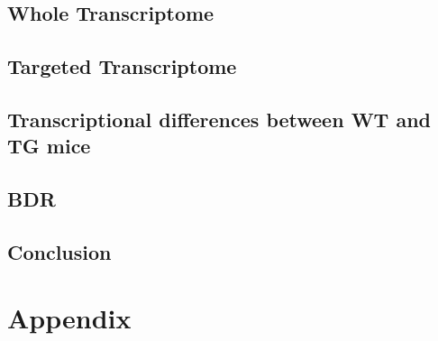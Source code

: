 \documentclass[a4paper,12pt,oneside]{report}
\begin{document}
\chapter{Whole Transcriptome}
%

\chapter{Targeted Transcriptome}
%

\chapter{Transcriptional differences between WT and TG mice}
%
%

\chapter{BDR}


\chapter{Conclusion}


\newpage
\part{Appendix} %
\begin{appendix}
%
%
\label{ch:alt_cDNA}
%
\end{appendix}



\end{document}
